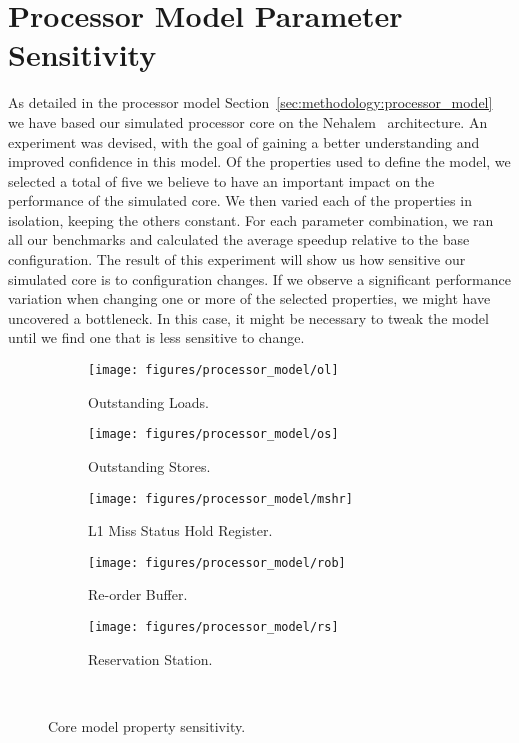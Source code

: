 
\section{Processor Model Parameter Sensitivity}
\label{sec:results:model_sensitivity}

As detailed in the processor model Section~\ref{sec:methodology:processor_model} we have based our simulated processor core on the Nehalem~\cite{Thomadakis2011} architecture.
An experiment was devised, with the goal of gaining a better understanding and improved confidence in this model.
Of the properties used to define the model, we selected a total of five we believe to have an important impact on the performance of the simulated core.
We then varied each of the properties in isolation, keeping the others constant.
For each parameter combination, we ran all our benchmarks and calculated the average speedup relative to the base configuration.
The result of this experiment will show us how sensitive our simulated core is to configuration changes.
If we observe a significant performance variation when changing one or more of the selected properties, we might have uncovered a bottleneck.
In this case, it might be necessary to tweak the model until we find one that is less sensitive to change.

\begin{figure}[H]
        \centering
        \begin{subfigure}[b]{0.5\textwidth}
                \texttt{[image: figures/processor\_model/ol]}
                \caption{Outstanding Loads.}
                \label{fig:results:processor_model:ol}
        \end{subfigure}%
        \begin{subfigure}[b]{0.5\textwidth}
                \texttt{[image: figures/processor\_model/os]}
                \caption{Outstanding Stores.}
                \label{fig:results:processor_model:os}
        \end{subfigure}
        \begin{subfigure}[b]{0.5\textwidth}
                \texttt{[image: figures/processor\_model/mshr]}
                \caption{L1 Miss Status Hold Register.}
                \label{fig:results:processor_model:mshr}
        \end{subfigure}%
        \begin{subfigure}[b]{0.5\textwidth}
                \texttt{[image: figures/processor\_model/rob]}
                \caption{Re-order Buffer.}
                \label{fig:results:processor_model:rob}
        \end{subfigure}
        \begin{subfigure}[b]{0.5\textwidth}
                \texttt{[image: figures/processor\_model/rs]}
                \caption{Reservation Station.}
                \label{fig:results:processor_model:rs}
        \end{subfigure}%
        \caption{Core model property sensitivity.}
        \label{fig:results:processor_model}
       ~ %
\end{figure}

